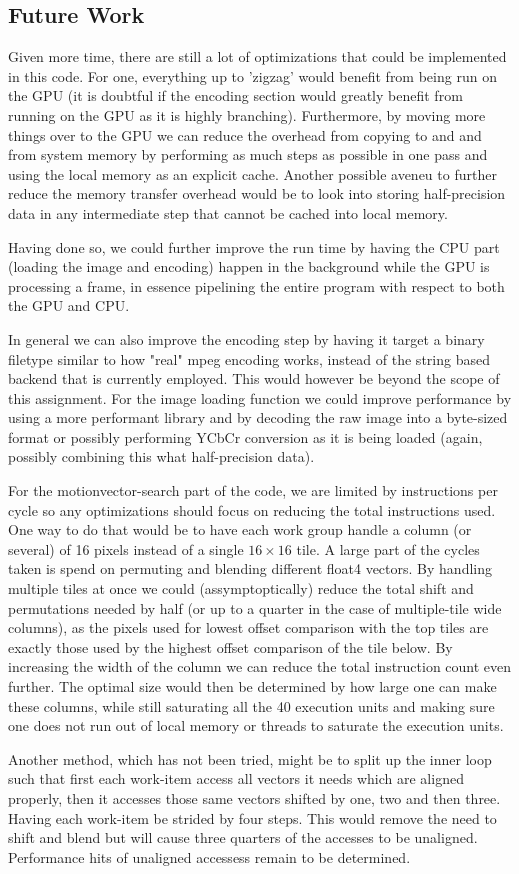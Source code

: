\subsection{Future Work}
Given more time, there are still a lot of optimizations that could be implemented in this code. For one, everything up to 'zigzag'  would benefit from being run on the GPU
(it is doubtful if the encoding section would greatly benefit from running on the GPU as it is highly branching). Furthermore, by moving more things over to the GPU we can reduce the overhead from copying to and and from system memory by
performing as much steps as possible in one pass and using the local memory as an explicit cache. Another possible aveneu to further reduce the memory transfer overhead would be to look into storing half-precision data in any intermediate step that
cannot be cached into local memory.
\par Having done so, we could further improve the run time by having the CPU part (loading the image and encoding) happen in the background while the GPU is processing a frame, in essence pipelining the entire
program with respect to both the GPU and CPU.
\par In general we can also improve the encoding step by having it target a binary filetype similar to how "real" mpeg encoding works, instead of the string based backend that is currently employed. This would however be beyond the scope
of this assignment. For the image loading function we could improve performance by using a more performant library and by decoding the raw image into a byte-sized format or possibly performing YCbCr conversion as it is being loaded (again, possibly combining
this what half-precision data).
\par For the motionvector-search part of the code, we are limited by instructions per cycle so any optimizations should focus on reducing the total instructions used.
One way to do that would be to have each work group handle a column (or several) of 16 pixels instead of a single $16\times16$ tile. A large part of the cycles taken is spend on permuting and blending different float4 vectors.
By handling multiple tiles at once we could (assymptoptically) reduce the total shift and permutations needed by
half (or up to a quarter in the case of multiple-tile wide columns), as the pixels used for lowest offset
comparison with the top tiles are exactly those used by the highest offset comparison of the tile below.
By increasing the width of the column we can reduce the total instruction count
even further. The optimal size would then be determined by how large one can make these columns, while still saturating all the 40 execution units and making sure one does not run out of local memory or threads to saturate the execution units.
\par Another method, which has not been tried, might be to split up the inner loop such that first each work-item access all vectors it needs which are aligned properly, then it accesses those same vectors shifted by one, two and then three. Having each work-item be
strided by four steps. This would remove the need to shift and blend but will cause three quarters of the accesses to be unaligned. Performance hits of unaligned accessess remain to be determined.

